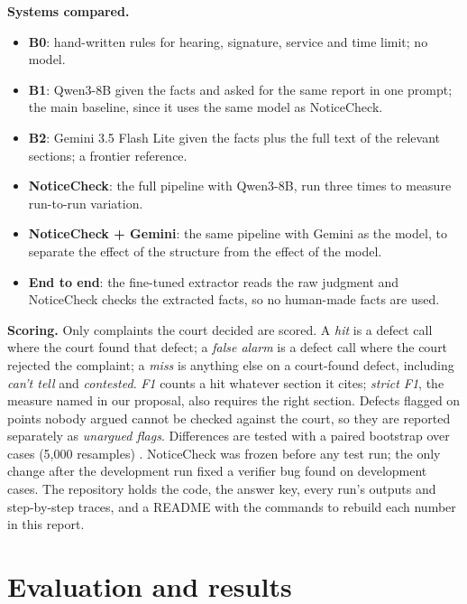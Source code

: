 \documentclass[10pt,a4paper]{article}
\begin{document}
\textbf{Systems compared.}
\begin{itemize}
\item \textbf{B0}: hand-written rules for hearing, signature, service and time limit; no model.
\item \textbf{B1}: Qwen3-8B given the facts and asked for the same report in one prompt; the main baseline, since it uses the same model as NoticeCheck.
\item \textbf{B2}: Gemini 3.5 Flash Lite given the facts plus the full text of the relevant sections; a frontier reference.
\item \textbf{NoticeCheck}: the full pipeline with Qwen3-8B, run three times to measure run-to-run variation.
\item \textbf{NoticeCheck + Gemini}: the same pipeline with Gemini as the model, to separate the effect of the structure from the effect of the model.
\item \textbf{End to end}: the fine-tuned extractor reads the raw judgment and NoticeCheck checks the extracted facts, so no human-made facts are used.
\end{itemize}

\textbf{Scoring.} Only complaints the court decided are scored. A \emph{hit} is a defect call where the court found that defect; a \emph{false alarm} is a defect call where the court rejected the complaint; a \emph{miss} is anything else on a court-found defect, including \emph{can't tell} and \emph{contested}. \emph{F1} counts a hit whatever section it cites; \emph{strict F1}, the measure named in our proposal, also requires the right section. Defects flagged on points nobody argued cannot be checked against the court, so they are reported separately as \emph{unargued flags}. Differences are tested with a paired bootstrap over cases (5,000 resamples) \cite{bootstrap}. NoticeCheck was frozen before any test run; the only change after the development run fixed a verifier bug found on development cases. The repository holds the code, the answer key, every run's outputs and step-by-step traces, and a README with the commands to rebuild each number in this report.

\section{Evaluation and results}
\end{document}
